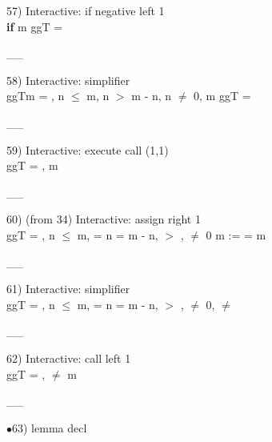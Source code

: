 \documentclass[a4paper]{article}
\begin{document}
57) Interactive: if negative left  1\\
\tabf \Do 
{\bf if}  %
 \tabf m %
\Fol \Do ggT\Dc {} = 

\vspace{-1.5ex}\_\hrulefill \_

58) Interactive: simplifier \\
\tabf \Do ggT\Dc m = , n $\le$ m, \Not n $>$ m - n, n $\neq$ 0, m %
\Fol \Do ggT\Dc {} = 

\vspace{-1.5ex}\_\hrulefill \_

59) Interactive: execute call  (1,1)\\
\Do ggT\Dc {} = , m %

\vspace{-1.5ex}\_\hrulefill \_

60)  (from 34) Interactive: assign right  1\\
\Do ggT\Dc {} = , n $\le$ m,  = n \And {} = m - n, \Not {} $>$ , \Not {} $\neq$ 0 \Fol \Do m := \Dc {} = m

\vspace{-1.5ex}\_\hrulefill \_

61) Interactive: simplifier \\
\Do ggT\Dc {} = , n $\le$ m,  = n \And {} = m - n, \Not {} $>$ , \Not {} $\neq$ 0,  $\neq$  \Fol 

\vspace{-1.5ex}\_\hrulefill \_

62) Interactive: call left  1\\
\Do ggT\Dc {} = ,  $\neq$ m \Fol 

\vspace{-1.5ex}\_\hrulefill \_

$\bullet$63) lemma decl \\
 \Fol 
\end{document}
